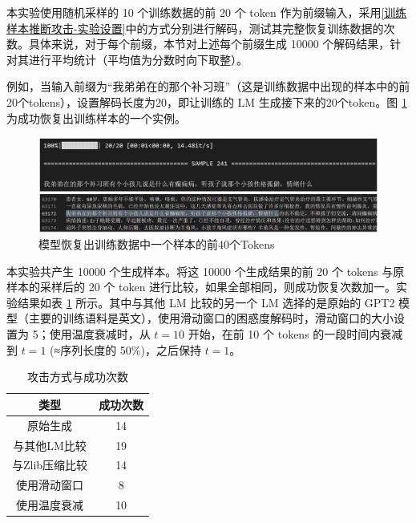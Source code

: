 本实验使用随机采样的 10 个训练数据的前 20 个 token 作为前缀输入，采用\ref{训练样本推断攻击-实验设置}中的方式分别进行解码，测试其完整恢复训练数据的次数。具体来说，对于每个前缀，本节对上述每个前缀生成 10000 个解码结果，针对其进行平均统计（平均值为分数时向下取整）。


例如，当输入前缀为“我弟弟在的那个补习班”（这是训练数据中出现的样本中的前20个tokens），设置解码长度为20，即让训练的 LM 生成接下来的20个token。图 \ref{Decode_Raw_CMDD_Prefix} 为成功恢复出训练样本的一个实例。

\begin{figure}[h]
	\centering
	\includegraphics[width=1\linewidth]{figures/Decode_Raw_CMDD_Prefix.png}
	\caption{模型恢复出训练数据中一个样本的前40个Tokens}
	\label{Decode_Raw_CMDD_Prefix}
\end{figure}


本实验共产生 10000 个生成样本。将这 10000 个生成结果的前 20 个 tokens 与原样本的采样后的 20 个 token 进行比较，如果全部相同，则成功恢复次数加一。实验结果如表 \ref{Attack_Method_with_Num_Success} 所示。其中与其他 LM 比较的另一个 LM 选择的是原始的 GPT2 模型\cite{GPT2}（主要的训练语料是英文），使用滑动窗口的困惑度解码时，滑动窗口的大小设置为 5；使用温度衰减时，从 $t=10$ 开始，在前 10 个 tokens 的一段时间内衰减到 $t=1$ (≈序列长度的 50\%)，之后保持 $t=1$。

\begin{table}[]
	\centering
	\caption{攻击方式与成功次数}
	\begin{tabular}{|c|c|}
		\hline
		类型&成功次数   \\ \hline
		原始生成& 14    \\ \hline
		与其他LM比较&19   \\ \hline
		与Zlib压缩比较&14    \\ \hline
		使用滑动窗口&8    \\ \hline
		使用温度衰减&10    \\ \hline
	\end{tabular}
	\label{Attack_Method_with_Num_Success}
\end{table}

